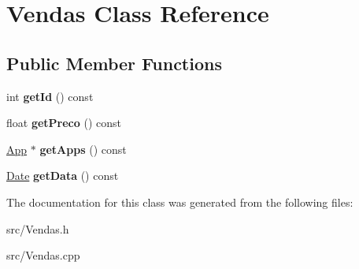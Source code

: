 \hypertarget{class_vendas}{\section{Vendas Class Reference}
\label{class_vendas}
}
\subsection*{Public Member Functions}
\begin{DoxyCompactItemize}
\item 
\hypertarget{class_vendas_a7e36a98494bec3b57d90afa0536a1be5}{int {\bfseries get\+Id} () const }\label{class_vendas_a7e36a98494bec3b57d90afa0536a1be5}

\item 
\hypertarget{class_vendas_aa5c8bcaced98ded9a22444ddf5935566}{float {\bfseries get\+Preco} () const }\label{class_vendas_aa5c8bcaced98ded9a22444ddf5935566}

\item 
\hypertarget{class_vendas_a5d97a7a64fc9aa2c3b38cbb582098bf4}{\hyperlink{class_app}{App} $\ast$ {\bfseries get\+Apps} () const }\label{class_vendas_a5d97a7a64fc9aa2c3b38cbb582098bf4}

\item 
\hypertarget{class_vendas_ab4f3bd058d7cfe6fc837e7804b9b3dcf}{\hyperlink{class_date}{Date} {\bfseries get\+Data} () const }\label{class_vendas_ab4f3bd058d7cfe6fc837e7804b9b3dcf}

\end{DoxyCompactItemize}


The documentation for this class was generated from the following files\+:\begin{DoxyCompactItemize}
\item 
src/Vendas.\+h\item 
src/Vendas.\+cpp\end{DoxyCompactItemize}
